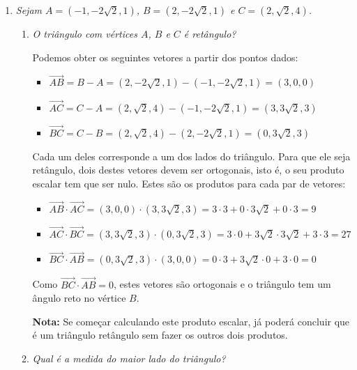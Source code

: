 \documentclass[12pt,a4paper]{article}
\newcommand{\vect}[1]{\overrightarrow{#1}}
\begin{document}
\begin{enumerate}
\item \textit{Sejam $A = (-1, -2\sqrt{2}, 1)$, $B = (2, -2\sqrt{2}, 1)$ e $C = (2, \sqrt{2}, 4)$.}
\begin{enumerate}
\item \textit{O triângulo com vértices $A$, $B$ e $C$ é retângulo?}

Podemos obter os seguintes vetores a partir dos pontos dados:
\begin{itemize}
\item $\vect{AB} = B - A
                 = (2, -2\sqrt{2}, 1) - (-1, -2\sqrt{2}, 1)
                 = (3, 0, 0)$
\item $\vect{AC} = C - A
                 = (2, \sqrt{2}, 4) - (-1, -2\sqrt{2}, 1)
                 = (3, 3\sqrt{2}, 3)$
\item $\vect{BC} = C - B
                 = (2, \sqrt{2}, 4) - (2, -2\sqrt{2}, 1)
                 = (0, 3\sqrt{2}, 3)$
\end{itemize}
Cada um deles corresponde a um dos lados do triângulo. Para que ele seja retângulo, dois destes vetores devem ser ortogonais, isto é, o seu produto escalar tem que ser nulo. Estes são os produtos para cada par de vetores:
\begin{itemize}
\item $\vect{AB} \cdot \vect{AC}
     = (3, 0, 0) \cdot (3, 3\sqrt{2}, 3)
     = 3\cdot 3 + 0 \cdot 3\sqrt{2} + 0 \cdot 3
     = 9$
\item $\vect{AC} \cdot \vect{BC}
     = (3, 3\sqrt{2}, 3) \cdot (0, 3\sqrt{2}, 3)
     = 3\cdot 0 + 3\sqrt{2} \cdot 3\sqrt{2} + 3 \cdot 3
     = 27$
\item $\vect{BC} \cdot \vect{AB}
     = (0, 3\sqrt{2}, 3) \cdot (3, 0, 0)
     = 0\cdot 3 + 3\sqrt{2} \cdot 0 + 3 \cdot 0
     = 0$
\end{itemize}
Como $\vect{BC} \cdot \vect{AB} = 0$, estes vetores são ortogonais e o triângulo tem um ângulo reto no vértice $B$.

\textbf{Nota:} Se começar calculando este produto escalar, já poderá concluir que é um triângulo retângulo sem fazer os outros dois produtos.
\item \textit{Qual é a medida do maior lado do triângulo?}


\end{enumerate}
\end{enumerate}
\end{document}
